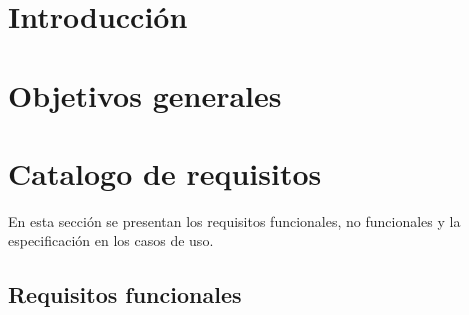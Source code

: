 
\section{Introducción}

\section{Objetivos generales}

\section{Catalogo de requisitos}
En esta sección se presentan los requisitos funcionales, no funcionales y la especificación en los casos de uso.
\subsection{Requisitos funcionales}\label{requisitos-funcionales}
